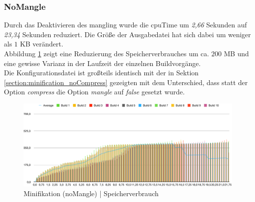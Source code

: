 \documentclass[11pt]{report}
\begin{document}
        		\subsubsection{NoMangle}
	        		Durch das Deaktivieren des \Gls{mangling} wurde die \Gls{cpuTime} um \emph{2,66} Sekunden auf \emph{23,34} Sekunden reduziert. Die Größe der Ausgabedatei hat sich dabei um weniger als $1$ KB verändert.\\
	        		Abbildung \ref{figure:minification_noMangle_memory} zeigt eine Reduzierung des Speicherverbrauches um ca. $200$ MB und eine gewisse Varianz in der Laufzeit der einzelnen Buildvorgänge.\\
        			Die Konfigurationsdatei ist großteils identisch mit der in Sektion \ref{section:minification_noCompress} gezeigten mit dem Unterschied, dass statt der Option \emph{compress} die Option \emph{mangle} auf \emph{false} gesetzt wurde.
			        \begin{figure}[p]
			            \includegraphics[width=\textwidth]{img/nondestr_minify_nomangle_memory}
			            \caption{Minifikation (noMangle) | Speicherverbrauch}
			            \label{figure:minification_noMangle_memory}
			        \end{figure}
\end{document}
